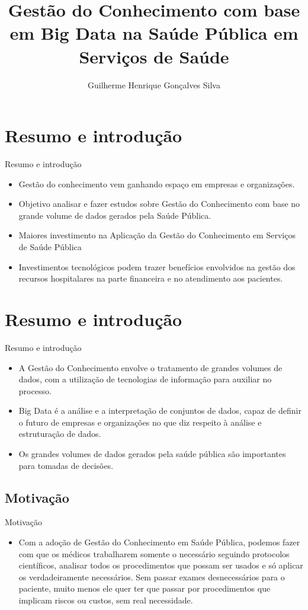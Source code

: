 \documentclass{beamer}
\title{Gestão do Conhecimento com base em Big Data na Saúde Pública em Serviços de Saúde}
\author{Guilherme Henrique Gonçalves Silva}
\institute[] %
{
  DEPARTAMENTO DE COMPUTAÇÃO\\
  Universidade Estadual de Londrina
}
\begin{document}
\begin{frame}
  \titlepage
\end{frame}

\section{Resumo e introdução}
\begin{frame}{Resumo e introdução}
  \begin{itemize}
  \item {Gestão do conhecimento vem ganhando espaço em empresas e organizações.
    }
    \item{Objetivo analisar e fazer estudos sobre Gestão do Conhecimento com base no grande volume de dados gerados pela Saúde Pública.}
    \item{Maiores investimento na Aplicação da Gestão do Conhecimento em Serviços de Saúde Pública  
  }
  \item {Investimentos tecnológicos podem trazer benefícios  envolvidos na gestão dos recursos hospitalares na parte financeira e no atendimento aos pacientes.
  }
  \end{itemize}
\end{frame}

\section{Resumo e introdução}
\begin{frame}{Resumo e introdução}
    \begin{itemize}
        \item {A Gestão do Conhecimento envolve o tratamento de grandes volumes de dados, com a utilização de tecnologias de informação para auxiliar no processo.
        }
        \item{Big Data é a análise e a interpretação de conjuntos de dados, capaz de definir o futuro de empresas e organizações no que diz respeito à análise e estruturação de dados.
        }
        \item{Os grandes volumes de dados gerados pela saúde pública são importantes para tomadas de decisões.}
    \end{itemize}
\end{frame}


\subsection{Motivação}
\begin{frame}{Motivação}
    \begin{itemize}
        \item{Com a adoção de Gestão do Conhecimento em Saúde Pública, podemos fazer com que os médicos trabalharem somente o necessário seguindo protocolos científicos, analisar todos os procedimentos que possam ser usados e só aplicar os verdadeiramente necessários. Sem passar exames desnecessários para o paciente, muito menos ele quer ter que passar por procedimentos que implicam riscos ou custos, sem real necessidade. }
    \end{itemize}
\end{frame}
\end{document}
